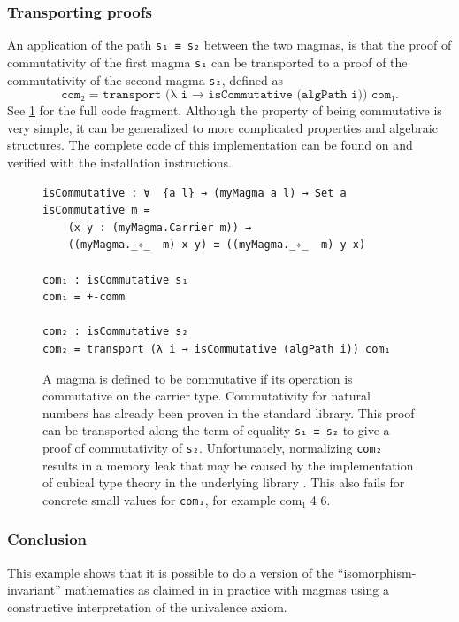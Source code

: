 \documentclass[12pt,a4paper,twoside,xetex]{book} %
\begin{document}
\subsubsection{Transporting proofs}


An application of the path \texttt{s₁ ≡ s₂} between the two magmas, is that the 
proof of commutativity of the first magma \texttt{s₁} can be transported to a 
proof of the commutativity of the second magma \texttt{s₂}, defined as 
$$\texttt{com₂ = transport (λ i → isCommutative (algPath i)) com₁}.$$ See \cref{comtrans} for the full code fragment. Although the 
property of being commutative is very simple, it can be generalized to more 
complicated properties and algebraic structures. The 
complete code of this implementation can be found on \cite{Van19} and verified 
with the installation instructions.

\begin{figure}\label{comtrans}
\begin{center}
\begin{BVerbatim}
isCommutative : ∀  {a l} → (myMagma a l) → Set a
isCommutative m = 
    (x y : (myMagma.Carrier m)) → 
    ((myMagma._✧_  m) x y) ≡ ((myMagma._✧_  m) y x)

com₁ : isCommutative s₁
com₁ = +-comm

com₂ : isCommutative s₂
com₂ = transport (λ i → isCommutative (algPath i)) com₁
\end{BVerbatim}
\end{center}
\caption{A magma is defined to be commutative if its operation is 
commutative on the carrier type. Commutativity for natural numbers has already 
been proven in the standard library. This proof can be transported along the 
term of equality \texttt{s₁ ≡ s₂} to give a proof of commutativity of 
\texttt{s₂}. Unfortunately, normalizing \texttt{com₂} results in a memory leak that may be caused by the implementation of cubical type theory in the underlying library \cite{Moertberg2018}. This also fails for concrete small values for \texttt{com₁}, for example {com₁ 4 6}.} 
\end{figure}

\subsubsection{Conclusion}

This example shows that it is possible to do a version of the ``isomorphism-invariant'' mathematics as claimed in \cite{Voevodsky2013} in practice with magmas using a constructive interpretation of the univalence axiom. 
\end{document}

